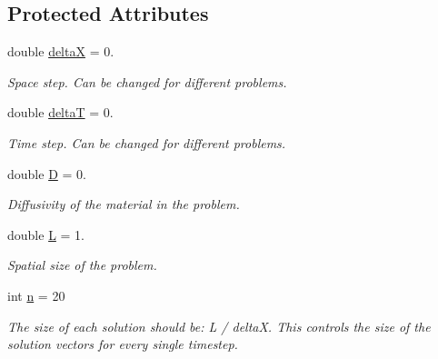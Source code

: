 \subsection*{Protected Attributes}
\begin{DoxyCompactItemize}
\item 
\mbox{\label{class_solution_a8e97e5534ddcde31983432b8fb2050ff}} 
double \hyperlink{class_solution_a8e97e5534ddcde31983432b8fb2050ff}{deltaX} = 0.
\begin{DoxyCompactList}\small\item\em Space step. Can be changed for different problems. \end{DoxyCompactList}\item 
\mbox{\label{class_solution_a116a08a1a8793618fb5269016cfd9b61}} 
double \hyperlink{class_solution_a116a08a1a8793618fb5269016cfd9b61}{deltaT} = 0.
\begin{DoxyCompactList}\small\item\em Time step. Can be changed for different problems. \end{DoxyCompactList}\item 
\mbox{\label{class_solution_af647b9b893549259060034672babb0f8}} 
double \hyperlink{class_solution_af647b9b893549259060034672babb0f8}{D} = 0.
\begin{DoxyCompactList}\small\item\em Diffusivity of the material in the problem. \end{DoxyCompactList}\item 
\mbox{\label{class_solution_afa80e5854fb5af93932f445e426c7f66}} 
double \hyperlink{class_solution_afa80e5854fb5af93932f445e426c7f66}{L} = 1.
\begin{DoxyCompactList}\small\item\em Spatial size of the problem. \end{DoxyCompactList}\item 
\mbox{\label{class_solution_aca95282163f453b465bb1991c596a34e}} 
int \hyperlink{class_solution_aca95282163f453b465bb1991c596a34e}{n} = 20
\begin{DoxyCompactList}\small\item\em The size of each solution should be\+: L / deltaX. This controls the size of the solution vectors for every single timestep. \end{DoxyCompactList}\item 

\end{DoxyCompactItemize}

